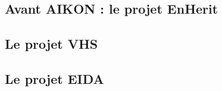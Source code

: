 \subsection{Avant AIKON : le projet EnHerit}

\subsection{Le projet VHS}

\subsection{Le projet EIDA}